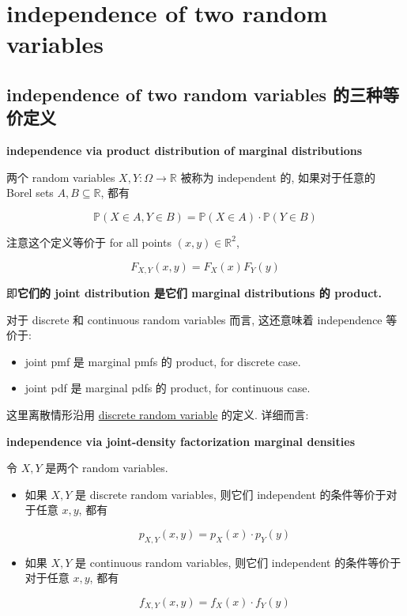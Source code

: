 \documentclass{qlnotes-export}
\begin{document}
\section{independence of two random variables}\label{independence-of-two-random-variables}

\subsection{independence of two random variables 的三种等价定义}\label{independence-of-two-random-variables-ux7684ux4e09ux79cdux7b49ux4ef7ux5b9aux4e49}

\begin{definition}{\protect{}\label{kn-independence-via-product-distribution}{\textbf{independence
via product distribution of marginal distributions}}}

两个 random variables \(X,Y:\Omega\rightarrow{\mathbb{R}}\) 被称为 independent 的, 如果对于任意的 Borel sets \(A,B \subseteq {\mathbb{R}}\), 都有

\[{\mathbb{P}}(X \in A,Y \in B) = {\mathbb{P}}(X \in A) \cdot {\mathbb{P}}(Y \in B)\]

注意这个定义等价于 for all points \((x,y) \in {\mathbb{R}}^{2}\),

\[F_{X,Y}(x,y) = F_{X}(x)F_{Y}(y)\]

即\textbf{它们的 joint distribution 是它们 marginal distributions 的 product.}

\end{definition}

对于 discrete 和 continuous random variables 而言, 这还意味着 independence 等价于:

\begin{itemize}
\item
  joint pmf 是 marginal pmfs 的 product, for discrete case.
\item
  joint pdf 是 marginal pdfs 的 product, for continuous case.
\end{itemize}

这里离散情形沿用 \href{https://qiulinfan.github.io/notes/math/probability/\#kn-discrete-random-variable}{discrete random variable} 的定义. 详细而言:

\begin{theorem}{\protect{}\label{kn-independence-via-joint-density-factorization}{\textbf{independence
via joint-density factorization marginal densities}}}

令 \(X,Y\) 是两个 random variables.

\begin{itemize}
\item
  如果 \(X,Y\) 是 discrete random variables, 则它们 independent 的条件等价于对于任意 \(x,y\), 都有

  \[p_{X,Y}(x,y) = p_{X}(x) \cdot p_{Y}(y)\]
\item
  如果 \(X,Y\) 是 continuous random variables, 则它们 independent 的条件等价于对于任意 \(x,y\), 都有

  \[f_{X,Y}(x,y) = f_{X}(x) \cdot f_{Y}(y)\]
\end{itemize}

\end{theorem}
\end{document}

